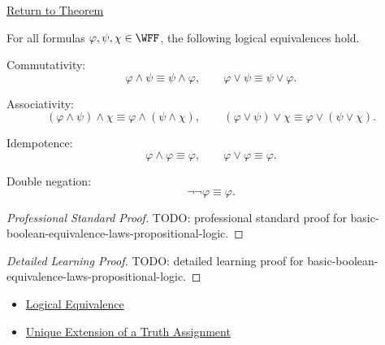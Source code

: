 \newpage
{}
\label{prf:basic-boolean-equivalence-laws-propositional-logic}

\begin{remark*}[Return]
\hyperref[thm:basic-boolean-equivalence-laws-propositional-logic]{Return to Theorem}
\end{remark*}

\begin{theorem*}
For all formulas \(\varphi,\psi,\chi\in\WFF\), the following logical equivalences hold.

Commutativity:
\[
\varphi\land\psi\equiv\psi\land\varphi,
\qquad
\varphi\lor\psi\equiv\psi\lor\varphi.
\]

Associativity:
\[
(\varphi\land\psi)\land\chi
\equiv
\varphi\land(\psi\land\chi),
\qquad
(\varphi\lor\psi)\lor\chi
\equiv
\varphi\lor(\psi\lor\chi).
\]

Idempotence:
\[
\varphi\land\varphi\equiv\varphi,
\qquad
\varphi\lor\varphi\equiv\varphi.
\]

Double negation:
\[
\neg\neg\varphi\equiv\varphi.
\]
\end{theorem*}

\begin{proof}[Professional Standard Proof]
\LRAProofBodyStart
TODO: professional standard proof for basic-boolean-equivalence-laws-propositional-logic.
\end{proof}

\begin{proof}[Detailed Learning Proof]
\LRAProofBodyStart
TODO: detailed learning proof for basic-boolean-equivalence-laws-propositional-logic.
\end{proof}

\begin{remark*}
\end{remark*}

\begin{dependencies}
\begin{itemize}
  \item \hyperref[def:logical-equivalence-propositional-logic]{Logical Equivalence}
  \item \hyperref[thm:unique-extension-truth-assignment-propositional-logic]{Unique Extension of a Truth Assignment}
\end{itemize}
\end{dependencies}

\clearpage
